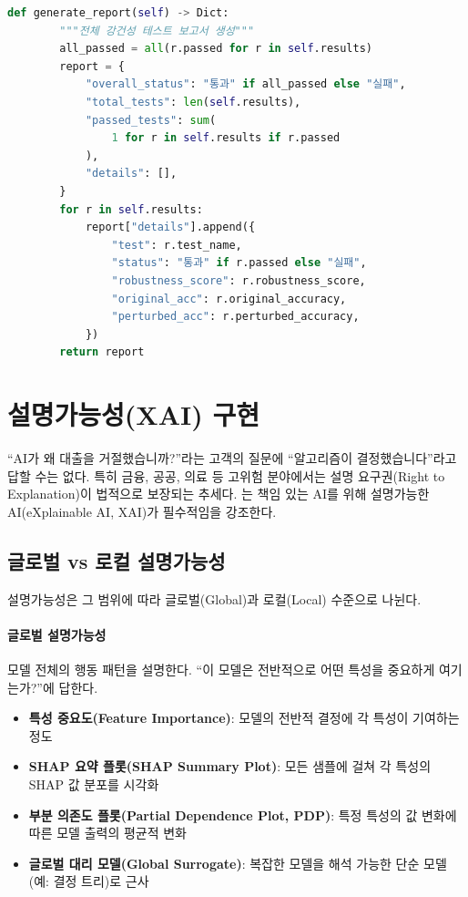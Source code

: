 \begin{lstlisting}[language=Python, caption={적대적 강건성 테스트 프레임워크}, label={lst:adversarial_test}]
    def generate_report(self) -> Dict:
        """전체 강건성 테스트 보고서 생성"""
        all_passed = all(r.passed for r in self.results)
        report = {
            "overall_status": "통과" if all_passed else "실패",
            "total_tests": len(self.results),
            "passed_tests": sum(
                1 for r in self.results if r.passed
            ),
            "details": [],
        }
        for r in self.results:
            report["details"].append({
                "test": r.test_name,
                "status": "통과" if r.passed else "실패",
                "robustness_score": r.robustness_score,
                "original_acc": r.original_accuracy,
                "perturbed_acc": r.perturbed_accuracy,
            })
        return report
\end{lstlisting}

\section{설명가능성(XAI) 구현}
\label{sec:10.5}

``AI가 왜 대출을 거절했습니까?''라는 고객의 질문에 ``알고리즘이 결정했습니다''라고 답할 수는 없다. 특히 금융, 공공, 의료 등 고위험 분야에서는 설명 요구권(Right to Explanation)이 법적으로 보장되는 추세다. \cite{arrieta2020explainable}는 책임 있는 AI를 위해 설명가능한 AI(eXplainable AI, XAI)가 필수적임을 강조한다.

\subsection{글로벌 vs 로컬 설명가능성}
\label{sec:10.5.1}

설명가능성은 그 범위에 따라 글로벌(Global)과 로컬(Local) 수준으로 나뉜다.

\paragraph{글로벌 설명가능성}
모델 전체의 행동 패턴을 설명한다. ``이 모델은 전반적으로 어떤 특성을 중요하게 여기는가?''에 답한다.
\begin{itemize}
  \item \textbf{특성 중요도(Feature Importance)}: 모델의 전반적 결정에 각 특성이 기여하는 정도
  \item \textbf{SHAP\cite{lundberg2017unified} 요약 플롯(SHAP Summary Plot)}: 모든 샘플에 걸쳐 각 특성의 SHAP 값 분포를 시각화
  \item \textbf{부분 의존도 플롯(Partial Dependence Plot, PDP)}: 특정 특성의 값 변화에 따른 모델 출력의 평균적 변화
  \item \textbf{글로벌 대리 모델(Global Surrogate)}: 복잡한 모델을 해석 가능한 단순 모델(예: 결정 트리)로 근사
\end{itemize}

